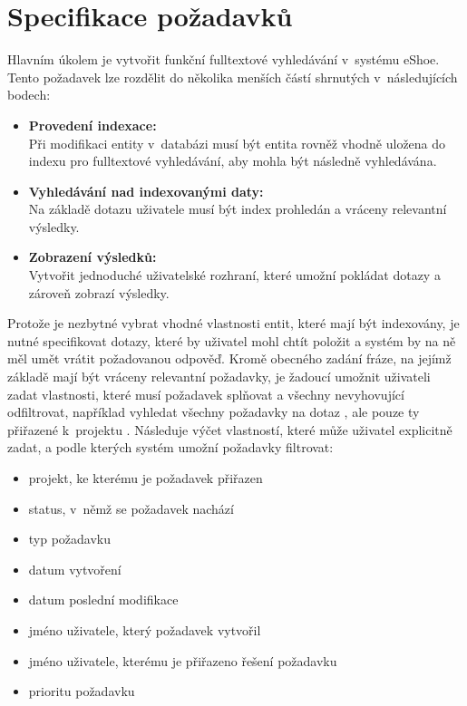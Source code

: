 \documentclass[11pt,oneside]{fithesis2}
\begin{document}
\section{Specifikace požadavků}
\label{SpecifikacePozadavku}
Hlavním úkolem je vytvořit funkční fulltextové vyhledávání v~systému eShoe. Tento požadavek lze rozdělit do několika menších částí shrnutých v~následujících bodech:
\begin{itemize}
	\item \textbf{Provedení indexace:} \\ 
		 Při modifikaci entity v~databázi musí být entita rovněž vhodně uložena do indexu pro fulltextové vyhledávání, aby mohla být následně vyhledávána.

	\item \textbf{Vyhledávání nad indexovanými daty:} \\
		Na základě dotazu uživatele musí být index prohledán a vráceny relevantní výsledky.

	\item \textbf{Zobrazení výsledků:} \\
		Vytvořit jednoduché uživatelské rozhraní, které umožní pokládat dotazy a zároveň zobrazí výsledky.		
\end{itemize}

Protože je nezbytné vybrat vhodné vlastnosti entit, které mají být indexovány, je nutné specifikovat dotazy, které by uživatel mohl chtít položit a systém by na ně měl umět vrátit požadovanou odpověď. Kromě obecného zadání fráze, na jejímž základě mají být vráceny relevantní požadavky, je žadoucí umožnit uživateli zadat vlastnosti, které musí požadavek splňovat a všechny nevyhovující odfiltrovat, například vyhledat všechny požadavky na dotaz , ale pouze ty přiřazené k~projektu . Následuje výčet vlastností, které může uživatel explicitně zadat, a podle kterých systém umožní požadavky filtrovat:
\begin{itemize}
	\item projekt, ke kterému je požadavek přiřazen
	\item status, v~němž se požadavek nachází
	\item typ požadavku
	\item datum vytvoření
	\item datum poslední modifikace
	\item jméno uživatele, který požadavek vytvořil
	\item jméno uživatele, kterému je přiřazeno řešení požadavku
	\item prioritu požadavku	 
\end{itemize}
\end{document}
